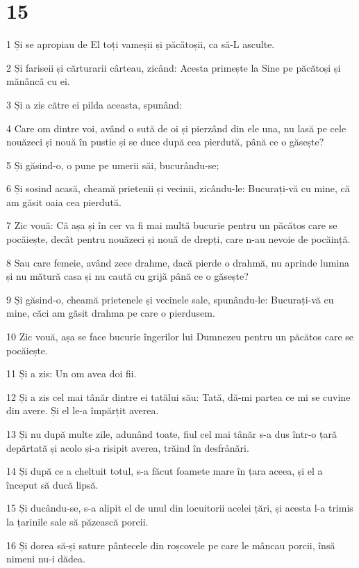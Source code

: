 \chapter{15}

\par 1 Și se apropiau de El toți vameșii și păcătoșii, ca să-L asculte.
\par 2 Și fariseii și cărturarii cârteau, zicând: Acesta primește la Sine pe păcătoși și mănâncă cu ei.
\par 3 Și a zis către ei pilda aceasta, spunând:
\par 4 Care om dintre voi, având o sută de oi și pierzând din ele una, nu lasă pe cele nouăzeci și nouă în pustie și se duce după cea pierdută, până ce o găsește?
\par 5 Și găsind-o, o pune pe umerii săi, bucurându-se;
\par 6 Și sosind acasă, cheamă prietenii și vecinii, zicându-le: Bucurați-vă cu mine, că am găsit oaia cea pierdută.
\par 7 Zic vouă: Că așa și în cer va fi mai multă bucurie pentru un păcătos care se pocăiește, decât pentru nouăzeci și nouă de drepți, care n-au nevoie de pocăință.
\par 8 Sau care femeie, având zece drahme, dacă pierde o drahmă, nu aprinde lumina și nu mătură casa și nu caută cu grijă până ce o găsește?
\par 9 Și găsind-o, cheamă prietenele și vecinele sale, spunându-le: Bucurați-vă cu mine, căci am găsit drahma pe care o pierdusem.
\par 10 Zic vouă, așa se face bucurie îngerilor lui Dumnezeu pentru un păcătos care se pocăiește.
\par 11 Și a zis: Un om avea doi fii.
\par 12 Și a zis cel mai tânăr dintre ei tatălui său: Tată, dă-mi partea ce mi se cuvine din avere. Și el le-a împărțit averea.
\par 13 Și nu după multe zile, adunând toate, fiul cel mai tânăr s-a dus într-o țară depărtată și acolo și-a risipit averea, trăind în desfrânări.
\par 14 Și după ce a cheltuit totul, s-a făcut foamete mare în țara aceea, și el a început să ducă lipsă.
\par 15 Și ducându-se, s-a alipit el de unul din locuitorii acelei țări, și acesta l-a trimis la țarinile sale să păzească porcii.
\par 16 Și dorea să-și sature pântecele din roșcovele pe care le mâncau porcii, însă nimeni nu-i dădea.
